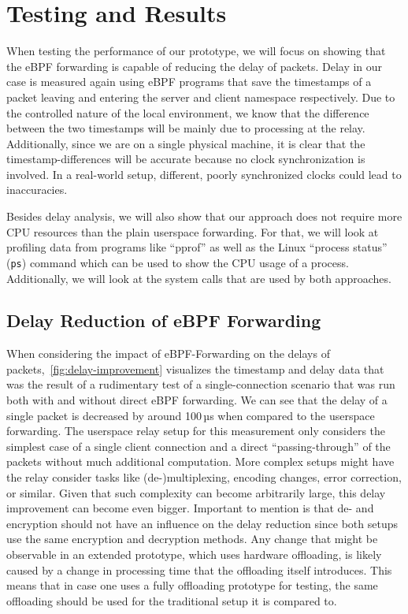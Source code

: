 \section{Testing and Results}\label{sec:testing_and_results}
When testing the performance of our prototype, we will focus on showing that the eBPF forwarding
is capable of reducing the delay of packets.
Delay in our case is measured again using eBPF programs that save the timestamps of a packet 
leaving and entering the server and client namespace respectively.
Due to the controlled nature of the local environment, we know that the difference 
between the two timestamps will be mainly due to processing at the relay.
Additionally, since we are on a single physical machine, it is clear that the timestamp-differences
will be accurate because no clock synchronization is involved.
In a real-world setup, different, poorly synchronized clocks could lead to inaccuracies.

Besides delay analysis, we will also show that our approach does not require more CPU resources than the plain userspace forwarding.
For that, we will look at profiling data from programs like ``pprof'' %
as well as the Linux ``process status'' (\verb|ps|) command which can be used to 
show the CPU usage of a process. %
Additionally, we will look at the system calls that are used by both approaches.

\subsection{Delay Reduction of eBPF Forwarding}
When considering the impact of eBPF-Forwarding on the delays of packets,~\autoref{fig:delay-improvement}
visualizes the timestamp and delay data that was the result of a rudimentary test of a single-connection 
scenario that was run both with and without direct eBPF forwarding.
We can see that the delay of a single packet is decreased by around 100\,µs
when compared to the userspace forwarding. 
The userspace relay setup for this measurement only considers the simplest case of a single client connection 
and a direct ``passing-through'' of the packets without much additional computation.
More complex setups might have the relay consider tasks like (de-)multiplexing, 
encoding changes, error correction, or similar. 
Given that such complexity can become arbitrarily large, this delay improvement can become even bigger.
Important to mention is that de- and encryption should not have an influence on the delay 
reduction since both setups use the same encryption and decryption methods.
Any change that might be observable in an extended prototype, which uses hardware offloading,
is likely caused by a change in processing time that the offloading itself introduces.
This means that in case one uses a fully offloading prototype for testing, the same offloading
should be used for the traditional setup it is compared to.

